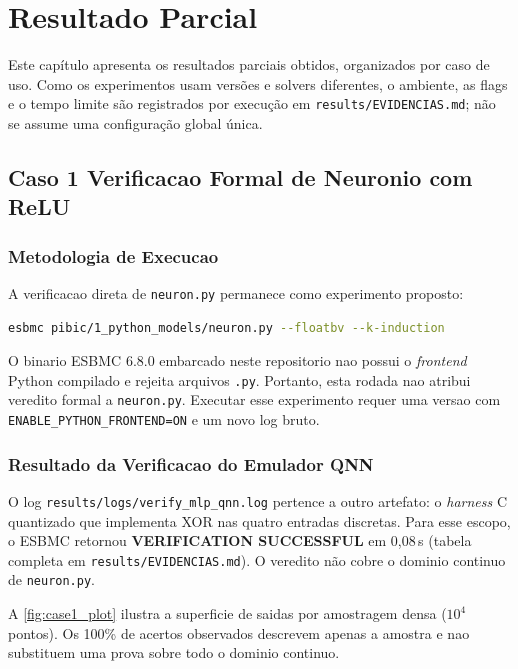 \chapter{Resultado Parcial}
\label{cap:resultados}

Este capítulo apresenta os resultados parciais obtidos, organizados por caso de uso. Como os experimentos usam versões e solvers diferentes, o ambiente, as flags e o tempo limite são registrados por execução em \texttt{results/EVIDENCIAS.md}; não se assume uma configuração global única.

\section{Caso 1 Verificacao Formal de Neuronio com ReLU}

\subsection{Metodologia de Execucao}

A verificacao direta de \texttt{neuron.py} permanece como experimento proposto:

\begin{lstlisting}[language=bash, numbers=none]
esbmc pibic/1_python_models/neuron.py --floatbv --k-induction
\end{lstlisting}

O binario ESBMC 6.8.0 embarcado neste repositorio nao possui o \textit{frontend}
Python compilado e rejeita arquivos \texttt{.py}. Portanto, esta rodada nao atribui
veredito formal a \texttt{neuron.py}. Executar esse experimento requer uma versao
com \texttt{ENABLE\_PYTHON\_FRONTEND=ON} e um novo log bruto.

\subsection{Resultado da Verificacao do Emulador QNN}

O log \texttt{results/logs/verify\_mlp\_qnn.log} pertence a outro artefato: o
\textit{harness} C quantizado que implementa XOR nas quatro entradas discretas.
Para esse escopo, o ESBMC retornou \textbf{VERIFICATION SUCCESSFUL} em 0,08\,s
(tabela completa em \texttt{results/EVIDENCIAS.md}). O veredito não cobre o
dominio continuo de \texttt{neuron.py}.

A \autoref{fig:case1_plot} ilustra a superficie de saidas por amostragem densa
($10^4$ pontos). Os 100\% de acertos observados descrevem apenas a amostra e nao
substituem uma prova sobre todo o dominio continuo.

